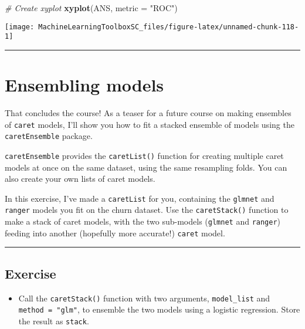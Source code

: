 \documentclass[
]{book}
\newenvironment{Shaded}{\begin{snugshade}}{\end{snugshade}}
\newcommand{\CommentTok}[1]{\textcolor[rgb]{0.56,0.35,0.01}{\textit{#1}}}
\newcommand{\DataTypeTok}[1]{\textcolor[rgb]{0.13,0.29,0.53}{#1}}
\newcommand{\KeywordTok}[1]{\textcolor[rgb]{0.13,0.29,0.53}{\textbf{#1}}}
\newcommand{\NormalTok}[1]{#1}
\newcommand{\StringTok}[1]{\textcolor[rgb]{0.31,0.60,0.02}{#1}}
\providecommand{\tightlist}{%
  \setlength{\itemsep}{0pt}\setlength{\parskip}{0pt}}
\begin{document}
\begin{Shaded}
\begin{Highlighting}[]
\CommentTok{# Create xyplot}
\KeywordTok{xyplot}\NormalTok{(ANS, }\DataTypeTok{metric =} \StringTok{"ROC"}\NormalTok{)}
\end{Highlighting}
\end{Shaded}

\begin{center}\texttt{[image: MachineLearningToolboxSC\_files/figure-latex/unnamed-chunk-118-1]} \end{center}

\begin{center}\rule{0.5\linewidth}{0.5pt}\end{center}

\hypertarget{ensembling-models}{%
\section{Ensembling models}\label{ensembling-models}}

That concludes the course! As a teaser for a future course on making ensembles of \texttt{caret} models, I'll show you how to fit a stacked ensemble of models using the \texttt{caretEnsemble} package.

\texttt{caretEnsemble} provides the \texttt{caretList()} function for creating multiple caret models at once on the same dataset, using the same resampling folds. You can also create your own lists of caret models.

In this exercise, I've made a \texttt{caretList} for you, containing the \texttt{glmnet} and \texttt{ranger} models you fit on the churn dataset. Use the \texttt{caretStack()} function to make a stack of caret models, with the two sub-models (\texttt{glmnet} and \texttt{ranger}) feeding into another (hopefully more accurate!) \texttt{caret} model.

\begin{center}\rule{0.5\linewidth}{0.5pt}\end{center}

\hypertarget{exercise-35}{%
\subsection*{Exercise}\label{exercise-35}}

\begin{itemize}
\tightlist
\item
  Call the \texttt{caretStack()} function with two arguments, \texttt{model\_list} and \texttt{method\ =\ "glm"}, to ensemble the two models using a logistic regression. Store the result as \texttt{stack}.
\end{itemize}
\end{document}
